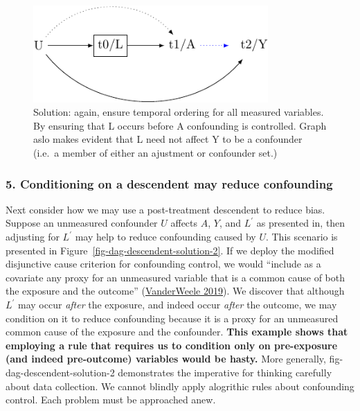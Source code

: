 \documentclass[
  singlecolumn]{article}
\begin{document}
\begin{figure}

{\centering \includegraphics[width=0.8\textwidth,height=\textheight]{causal-dags_files/figure-pdf/fig-dag-descendent-solution-1.pdf}

}

\caption{\label{fig-dag-descendent-solution}Solution: again, ensure
temporal ordering for all measured variables. By ensuring that L occurs
before A confounding is controlled. Graph aslo makes evident that L need
not affect Y to be a confounder (i.e.~a member of either an ajustment or
confounder set.)}

\end{figure}

\hypertarget{conditioning-on-a-descendent-may-reduce-confounding}{%
\subsubsection{5. Conditioning on a descendent may reduce
confounding}\label{conditioning-on-a-descendent-may-reduce-confounding}}

Next consider how we may use a post-treatment descendent to reduce bias.
Suppose an unmeasured confounder \(U\) affects \(A\), \(Y\), and
\(L^\prime\) as presented in, then adjusting for \(L^\prime\) may help
to reduce confounding caused by \(U\). This scenario is presented in
Figure~\ref{fig-dag-descendent-solution-2}. If we deploy the modified
disjunctive cause criterion for confounding control, we would ``include
as a covariate any proxy for an unmeasured variable that is a common
cause of both the exposure and the outcome''
(\protect\hyperlink{ref-vanderweele2019}{VanderWeele 2019}). We discover
that although \(L^\prime\) may occur \emph{after} the exposure, and
indeed occur \emph{after} the outcome, we may condition on it to reduce
confounding because it is a proxy for an unmeasured common cause of the
exposure and the confounder. \textbf{This example shows that employing a
rule that requires us to condition only on pre-exposure (and indeed
pre-outcome) variables would be hasty.} More generally,
fig-dag-descendent-solution-2 demonstrates the imperative for thinking
carefully about data collection. We cannot blindly apply alogrithic
rules about confounding control. Each problem must be approached anew.
\end{document}
